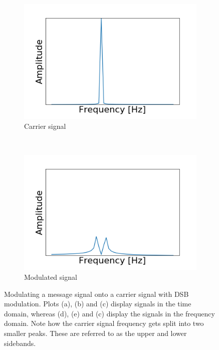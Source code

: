 \documentclass[]{article}
\begin{document}
\begin{figure}[h!]
\begin{subfigure}[b]{0.3\textwidth}
		\includegraphics[width=\textwidth]{figs/amplitude_modulation/dsb/carrier_signal_freq.png}
		\caption{Carrier signal}
		\label{fig:dsb_carrier_signal_freq}
	\end{subfigure}
	~ %
	\begin{subfigure}[b]{0.3\textwidth}
		\includegraphics[width=\textwidth]{figs/amplitude_modulation/dsb/modulated_signal_freq.png}
		\caption{Modulated signal}
		\label{fig:dsb_modulated_signal_freq}
	\end{subfigure}
	\caption{Modulating a message signal onto a carrier signal with DSB modulation. Plots (a), (b) and (c) display signals in the time domain, whereas (d), (e) and (c) display the signals in the frequency domain. Note how the carrier signal frequency gets split into two smaller peaks. These are referred to as the upper and lower sidebands.}\label{fig:dsb_modulation}
\end{figure}
\end{document}

